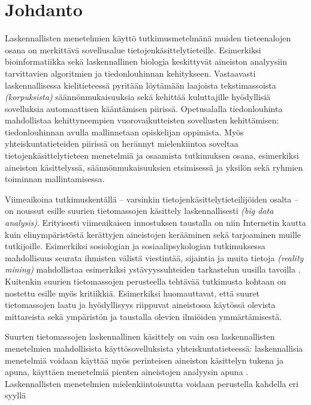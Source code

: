 \documentclass[finnish,gradu,twoside,12pt]{tktltiki}
\begin{document}
\mytableofcontents

\section{Johdanto}

Laskennallisten menetelmien käyttö tutkimusmetelmänä muiden tieteenalojen osana on merkittävä sovellusalue tietojenkäsittelytieteille. Esimerkiksi bioinformatiikka sekä laskennallinen biologia keskittyvät aineiston analyysiin tarvittavien algoritmien ja tiedonlouhinnan kehitykseen. Vastaavasti laskennallisessa kielitieteessä pyritään löytämään laajoista tekstimassoista \textit{(korpuksista)} säännönmukaisuuksia sekä kehittää kuluttajille hyödyllisiä sovelluksia automaattisen kääntämisen piirissä. Opetusalalla tiedonlouhinta mahdollistaa kehittyneempien vuorovaikutteisten sovellusten kehittämisen: tiedonlouhinnan avulla mallinnetaan opiskelijan oppimista. Myös yhteiskuntatieteiden piirissä on herännyt mielenkiintoa soveltaa tietojenkäsittelytieteen menetelmiä ja osaamista tutkimuksen osana, esimerkiksi aineiston käsittelyssä, säännönmukaisuuksien etsimisessä ja yksilön sekä ryhmien toiminnan mallintamisessa.

Viimeaikoina tutkimuskentällä -- varsinkin tietojenkäsittelytieteilijöiden osalta -- on noussut esille suurien tietomassojen käsittely laskennallisesti \textit{(big data analysis)}. Erityisesti viimeaikaisen innostuksen taustalla on niin Internetin kautta \citep{adamic05,notess02} kuin elinympäristöstä kerättyjen aineistojen \citep{eagle06,oulasvirta12} kerääminen sekä tarjoaminen muille tutkijoille. Esimerkiksi sosiologian ja sosiaalipsykologian tutkimuksessa mahdollisuus seurata ihmisten välistä viestintää, sijaintia ja muita tietoja \textit{(reality mining)} mahdollistaa esimerkiksi ystävyyssuhteiden tarkastelun uusilla tavoilla \citep[esimerkiksi][]{Karikoski2011a,Nelimarkka2012}. Kuitenkin suurien tietomassojen perusteella tehtävää tutkimusta kohtaan on nostettu esille myös kritiikkiä. Esimerkiksi \citet{Boyd2012a} huomauttavat, että suuret tietomassojen laatu ja hyödyllisyys riippuvat aineistossa käytössä olevista mittareista sekä ympäristön ja taustalla olevien ilmiöiden ymmärtämisestä.

Suurten tietomassojen laskennallinen käsittely on vain osa laskennallisten menetelmien mahdollisista käyttösovelluksista yhteiskuntatieteessä: laskennallisia menetelmiä voidaan käyttää myös perinteisen aineiston käsittelyn tukena ja apuna, käyttäen menetelmiä pienten aineistojen analyysin apuna \citep{pertti}. Laskennallisten menetelmien mielenkiintoisuutta voidaan perustella kahdella eri syyllä
\end{document}
